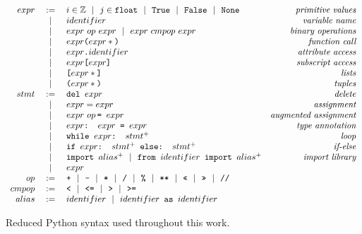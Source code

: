 \begin{figure}
\[\begin{array}{rclr}
    expr  &:=& i \in \mathbb{Z} ~~|~~ j \in \texttt{float} ~~|~~ \texttt{True} ~~|~~
    \texttt{False} ~~|~~ \texttt{None} & \textit{primitive values} \\
     &~~|~~& identifier & \textit{variable name} \\
     &~~|~~& expr~op~expr ~~|~~ expr~cmpop~expr & \textit{binary operations} \\
     &~~|~~& expr\texttt{(}expr*\texttt{)}     & \textit{function call} \\
     &~~|~~& expr\texttt{.}identifier & \textit{attribute access} \\
     &~~|~~& expr\texttt{[}expr\texttt{]}      & \textit{subscript access} \\
     &~~|~~& \texttt{[}expr*\texttt{]}         & \textit{lists} \\
     &~~|~~& \texttt{(}expr*\texttt{)}         & \textit{tuples} \\

  stmt &:=& \texttt{del } expr  & \textit{delete} \\
     &~~|~~& expr = expr         & \textit{assignment} \\
     &~~|~~& expr~op\hspace{-0.35em}\texttt{ = } expr       & \textit{augmented assignment} \\
     &~~|~~& expr\texttt{: } expr \texttt{ = } expr         & \textit{type annotation} \\
     &~~|~~& \texttt{while } expr\texttt{: } stmt^+         & \textit{loop} \\
     &~~|~~& \texttt{if } expr\texttt{: } stmt^+ \texttt{ else: } stmt^+  & \textit{if-else} \\
     &~~|~~& \texttt{import } alias^+
     ~~|~~ \texttt{from } identifier \texttt{ import } alias^+   & \textit{import library} \\
     &~~|~~& expr & \\

  op &:=& \texttt{+} ~~|~~ \texttt{-} ~~|~~ \texttt{*} ~~|~~ \texttt{/} ~~|~~ \texttt{\%} ~~|~~ \texttt{**} ~~|~~
      \texttt{<<} ~~|~~ \texttt{>>} ~~|~~ \texttt{//}  & \\
  cmpop &:=& \texttt{<} ~~|~~ \texttt{<=} ~~|~~ \texttt{>} ~~|~~ \texttt{>=}  & \\

  alias &:=& identifier ~~|~~ identifier \texttt{ as } identifier  & \\

\end{array}\]
\caption{Reduced Python syntax used throughout this work.\label{syntaxPythonAppen}}
\end{figure}


